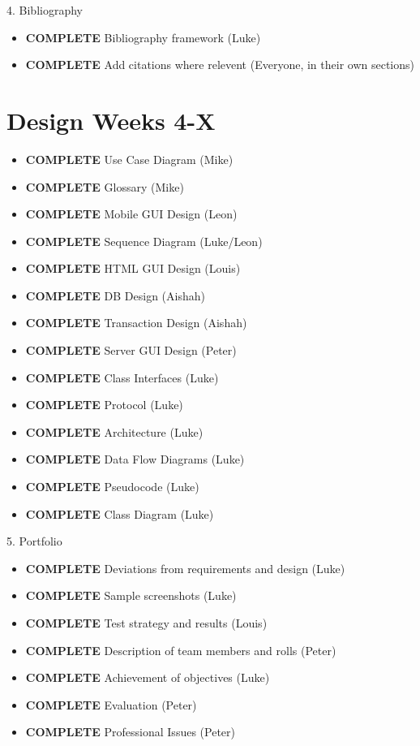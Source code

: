 4. Bibliography
\begin{itemize}
\item \textbf{COMPLETE} Bibliography framework (Luke)
\item \textbf{COMPLETE} Add citations where relevent (Everyone, in their own sections)
\end{itemize}

\section{Design \textbf{Weeks 4-X}}
\begin{itemize}
\item \textbf{COMPLETE}   Use Case Diagram (Mike)
\item \textbf{COMPLETE}   Glossary (Mike)
\item \textbf{COMPLETE}   Mobile GUI Design (Leon)
\item \textbf{COMPLETE}   Sequence Diagram (Luke/Leon)
\item \textbf{COMPLETE}   HTML GUI Design (Louis)
\item \textbf{COMPLETE}   DB Design (Aishah)
\item \textbf{COMPLETE}   Transaction Design (Aishah)
\item \textbf{COMPLETE}   Server GUI Design (Peter)
\item \textbf{COMPLETE}   Class Interfaces (Luke)
\item \textbf{COMPLETE}   Protocol (Luke)
\item \textbf{COMPLETE}   Architecture (Luke)
\item \textbf{COMPLETE}   Data Flow Diagrams (Luke)
\item \textbf{COMPLETE}   Pseudocode (Luke)
\item \textbf{COMPLETE}   Class Diagram (Luke)
\end{itemize}

5. Portfolio
\begin{itemize}
\item \textbf{COMPLETE}   Deviations from requirements and design (Luke)
\item \textbf{COMPLETE}   Sample screenshots (Luke)
\item \textbf{COMPLETE}   Test strategy and results (Louis)
\item \textbf{COMPLETE}   Description of team members and rolls (Peter)
\item \textbf{COMPLETE}   Achievement of objectives (Luke)
\item \textbf{COMPLETE}   Evaluation (Peter)
\item \textbf{COMPLETE}   Professional Issues (Peter)
\end{itemize}

